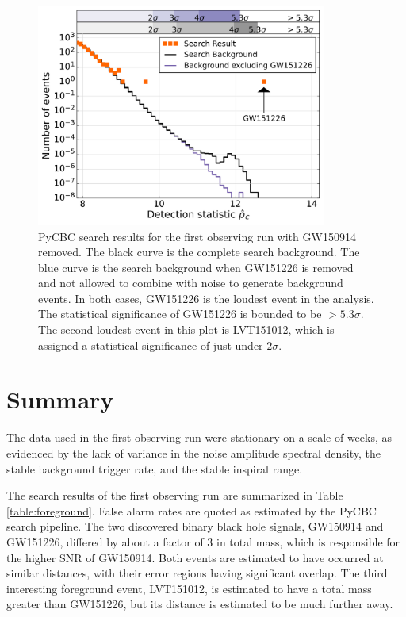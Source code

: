 \begin{figure}[ht!]%
\includegraphics[width=0.85\textwidth]{figures/O1/pycbc_hist_GW151226}
\caption[PyCBC result histograms for GW151226]{PyCBC search results for the %
         first observing run with GW150914 removed. The black curve is the %
         complete search background. The blue curve is the search background %
         when GW151226 is removed and not allowed to combine with noise to %
         generate background events. In both cases, GW151226 is the loudest %
         event in the analysis. The statistical significance of GW151226 %
         is bounded to be $> 5.3\sigma$. The second loudest event in this %
         plot is LVT151012, which is assigned a statistical significance of %
         just under $2\sigma$.}
\label{fig:pycbc-hist-gw151226}
\end{figure}

\section{Summary}

The data used in the first observing run were stationary on a scale of 
weeks, as evidenced by the lack of variance in the noise amplitude 
spectral density, the stable background trigger rate, and the stable 
inspiral range.

The search results of the first observing run are summarized in Table 
\ref{table:foreground}. False alarm rates are quoted as estimated by the 
PyCBC search pipeline.  
The two discovered binary black hole signals, GW150914 and GW151226, differed 
by about a factor of 3 in total mass, which is responsible for the higher SNR  
of GW150914. Both events are estimated to have occurred at similar distances, 
with their error regions having significant overlap. 
The third interesting foreground event,
LVT151012, is estimated to have a total mass greater than GW151226, but its
distance is estimated to be much further away.

